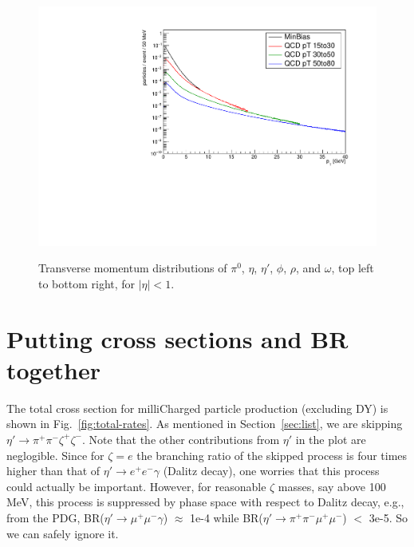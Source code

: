 \documentclass[12pt]{article}
\begin{document}
\begin{figure}
  \includegraphics[width=0.48\linewidth]{plots/h_omega.pdf} \\
  \caption{\protect Transverse momentum distributions of 
$\pi^0$, $\eta$, $\eta'$, $\phi$, $\rho$, and $\omega$, top left
to bottom right, for $|\eta| < 1$.}
\label{fig:mesons}
\end{figure}

\clearpage


\section{Putting cross sections and BR together}
\label{sec:bottom-line}

The total cross section for milliCharged particle production (excluding
DY) is shown in Fig.~\ref{fig:total-rates}.  
As mentioned in
Section~\ref{sec:list}, we are skipping $\eta' \to \pi^+ \pi^- \zeta^+
\zeta^-$.
Note that the other contributions from $\eta'$ in the plot are neglogible.
Since for $\zeta = e$ the branching ratio of the skipped process is four
times higher than
that of $\eta' \to e^+ e^- \gamma$ (Dalitz decay), one worries that
this
process could actually be important.  However, for reasonable $\zeta$
masses, say above 100 MeV, this process is suppressed by phase space
with respect to Dalitz decay, e.g., from the PDG,
BR($\eta' \to \mu^+ \mu^- \gamma$) $\approx$ 1e-4 while
BR($\eta' \to \pi^+ \pi^- \mu^+ \mu^-$) $<$ 3e-5.  So we can safely ignore it.
\end{document}
